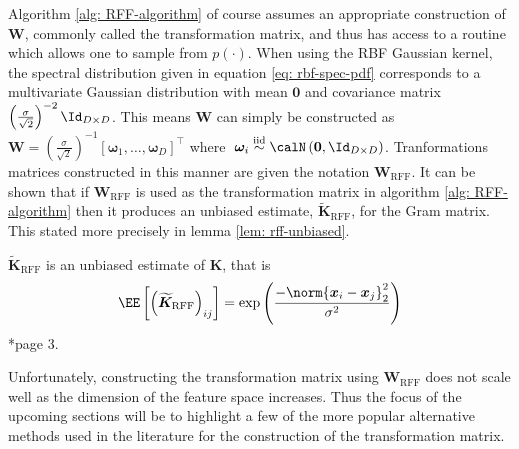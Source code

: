 Algorithm \ref{alg: RFF-algorithm} of course assumes an appropriate construction of $\bm{W}$, commonly called the transformation matrix, and thus has access to a routine which allows one to sample from $p(\cdot)$. When using the RBF Gaussian kernel, the spectral distribution given in equation \ref{eq: rbf-spec-pdf} corresponds to a multivariate Gaussian distribution with mean $\bm{0}$ and covariance matrix $\left( \frac{\sigma}{\sqrt{2}} \right)^{-2} \Id_{D \times D}$. This means $\bm{W}$ can simply be constructed as $\bm{W} = \left( \frac{\sigma}{\sqrt{2}} \right)^{-1} \left[ \bm{\omega}_1 ,\ldots , \bm{\omega}_D \right]^{\intercal}$ where $\; \bm{\omega}_i \stackrel{\text{iid}}{\sim} \calN \left( \bm{0} , \Id_{D \times D} \right)$. Tranformations matrices constructed in this manner are given the notation $\bm{W}_{\text{RFF}}$. It can be shown that if $\bm{W}_{\text{RFF}}$ is used as the transformation matrix in algorithm \ref{alg: RFF-algorithm} then it produces an unbiased estimate, $\bm{\widetilde{K}}_{\text{RFF}}$, for the Gram matrix. This stated more precisely in lemma \ref{lem: rff-unbiased}.

\begin{lem} \label{lem: rff-unbiased}
    $\bm{\widetilde{K}}_{\text{RFF}}$ is an unbiased estimate of $\bm{K}$, that is
    \[
        \EE \left[ \left( \bm{\widetilde{K}}_{\text{RFF}} \right)_{ij} \right] = \exp \left( \frac{- \norm{\bm{x}_i - {\bm{x}_j}}_{2}^{2}}{\sigma^2} \right)
    \] \cite{YuFelixX2016ORF}*{page 3}.
\end{lem}

Unfortunately, constructing the transformation matrix using $\bm{W}_{\text{RFF}}$ does not scale well as the dimension of the feature space increases. Thus the focus of the upcoming sections will be to highlight a few of the more popular alternative methods used in the literature for the construction of the transformation matrix.